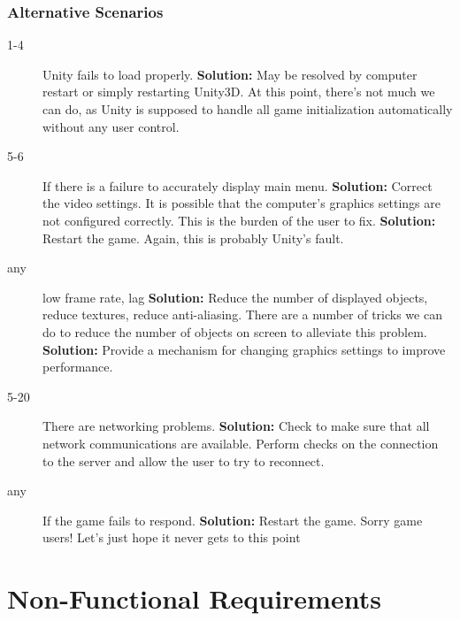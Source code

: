 \documentclass[10pt,letterpaper,oneside,english]{report}
\newcommand{\solution}{\newline \hspace*{1em} \textbf{Solution: }}
\begin{document}
	\subsubsection{Alternative Scenarios}
	\begin{description}
		\item[1-4] Unity fails to load properly.
			\solution{May be resolved by computer restart or simply restarting Unity3D. At this point, there’s not much we can do, as Unity is supposed to handle all game initialization automatically without any user control.}
		\item[5-6] If there is a failure to accurately display main menu.
			\solution{Correct the video settings. It is possible that the computer’s graphics settings are not configured correctly. This is the burden of the user to fix.}
			\solution{Restart the game. Again, this is probably Unity’s fault.}
		\item[any] low frame rate, lag
			\solution{Reduce the number of displayed objects, reduce textures, reduce anti-aliasing. There are a number of tricks we can do to reduce the number of objects on screen to alleviate this problem.}
			\solution{Provide a mechanism for changing graphics settings to improve performance.}
		\item[5-20] There are networking problems.
			\solution{Check to make sure that all network communications are available. Perform checks on the connection to the server and allow the user to try to reconnect.}
		\item[any] If the game fails to respond.
			\solution{Restart the game. Sorry game users! Let’s just hope it never gets to this point \textellipsis}
	\end{description}


\section{Non-Functional Requirements}
\label{Non-Functional Requirements}
\end{document}
